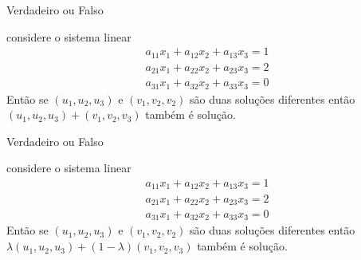 \documentclass{beamer}
\begin{document}
\begin{frame}{Verdadeiro ou Falso}
  \begin{block}{5}
  considere o sistema linear
  \begin{gather*}
    a_{11}x_1 + a_{12}x_2  + a_{13}x_3= 1 \\
    a_{21}x_1 + a_{22}x_2  + a_{23}x_3= 2\\
    a_{31}x_1 + a_{32}x_2 + a_{33}x_3= 0
  \end{gather*}
  Então se $(u_1,u_2,u_3)$ e $(v_1,v_2,v_2)$ são duas soluções diferentes então
  $(u_1,u_2,u_3)+ (v_1,v_2,v_3)$ também é solução.
\end{block}
\end{frame}
\begin{frame}{Verdadeiro ou Falso}
  \begin{block}{5}
  considere o sistema linear
  \begin{gather*}
    a_{11}x_1 + a_{12}x_2  + a_{13}x_3= 1 \\
    a_{21}x_1 + a_{22}x_2  + a_{23}x_3= 2\\
    a_{31}x_1 + a_{32}x_2 + a_{33}x_3= 0
  \end{gather*}
  Então se $(u_1,u_2,u_3)$ e $(v_1,v_2,v_2)$ são duas soluções diferentes então
  $\lambda(u_1,u_2,u_3)+ (1-\lambda)(v_1,v_2,v_3)$ também é solução.
\end{block}
\end{frame}
\end{document}
